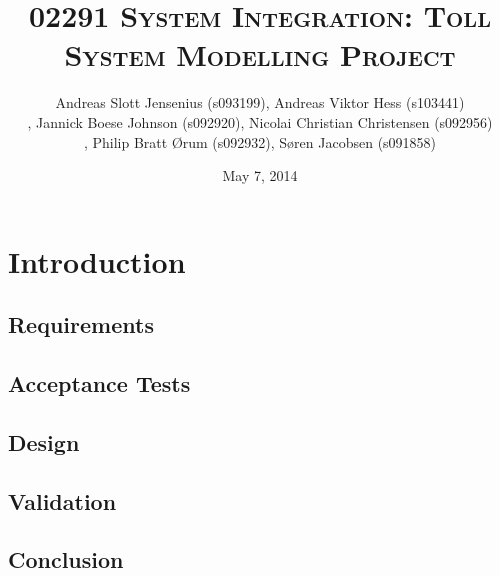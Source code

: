 \documentclass[11pt]{report}
\begin{document}
\title{\textsc{02291 System Integration: Toll System Modelling Project}}
\date{May 7, 2014}
\author{Andreas Slott Jensenius (s093199), Andreas Viktor Hess (s103441)\\,
        Jannick Boese Johnson (s092920), Nicolai Christian Christensen (s092956)\\,
        Philip Bratt Ørum (s092932), Søren Jacobsen (s091858)}
        

\maketitle

\fancyhead{}
\fancyfoot{}
\fancyfoot[C]{\thepage}

\pagestyle{fancy}


\chapter{Introduction}



\section{Requirements}


\section{Acceptance Tests}


\section{Design}


\section{Validation}


\section{Conclusion}

\end{document}
